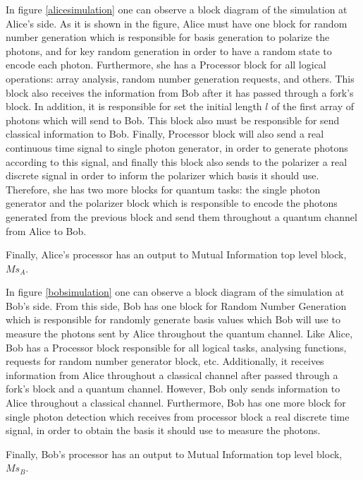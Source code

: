 \begin{enumerate}
    In figure \ref{alicesimulation} one can observe a block diagram of the simulation at Alice's side. As it is shown in the figure, Alice must have one block for random number generation which is responsible for basis generation to polarize the photons, and for key random generation in order to have a random state to encode each photon. Furthermore, she has a Processor block for all logical operations: array analysis, random number generation requests, and others. This block also receives the information from Bob after it has passed through a fork's block. In addition, it is responsible for set the initial length $l$ of the first array of photons which will send to Bob. This block also must be responsible for send classical information to Bob. Finally, Processor block will also send a real continuous time signal to single photon generator, in order to generate photons according to this signal, and finally this block also sends to the polarizer a real discrete signal in order to inform the polarizer which basis it should use. Therefore, she has two more blocks for quantum tasks: the single photon generator and the polarizer block which is responsible to encode the photons generated from the previous block and send them throughout a quantum channel from Alice to Bob.

    Finally, Alice's processor has an output to Mutual Information top level block, $Ms_{A}$.

     In figure \ref{bobsimulation} one can observe a block diagram of the simulation at Bob's side. From this side, Bob has one block for Random Number Generation which is responsible for randomly generate basis values which Bob will use to measure the photons sent by Alice throughout the quantum channel. Like Alice, Bob has a Processor block responsible for all logical tasks, analysing functions, requests for random number generator block, etc. Additionally, it receives information from Alice throughout a classical channel after passed through a fork's block and a quantum channel. However, Bob only sends information to Alice throughout a classical channel. Furthermore, Bob has one more block for single photon detection which receives from processor block a real discrete time signal, in order to obtain the basis it should use to measure the photons.

    Finally, Bob's processor has an output to Mutual Information top level block, $Ms_{B}$.




\end{enumerate}

